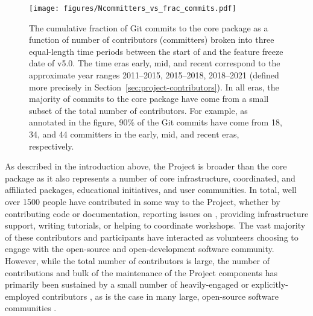 \documentclass[modern]{aastex631}
\begin{document}
\begin{figure}[t!]
    \begin{centering}
      \texttt{[image: figures/Ncommitters\_vs\_frac\_commits.pdf]}
        \caption{
            The cumulative fraction of Git commits to the \astropypkg core
            package as a function of number of contributors (committers) broken
            into three equal-length time periods between the start of \astropypkg
            and the feature freeze date of v5.0.
            The time eras early, mid, and recent correspond to the approximate
            year ranges 2011--2015, 2015--2018, 2018--2021 (defined more
            precisely in Section~\ref{sec:project-contributors}).
            In all eras, the majority of commits to the \astropypkg core package
            have come from a small subset of the total number of contributors.
            For example, as annotated in the figure, 90\% of the Git commits
            have come from 18, 34, and 44 committers in the early, mid, and
            recent eras, respectively.
        }
        \label{fig:contributor-summary:Ncommitters}
    \end{centering}
\end{figure}

As described in the introduction above, the \astropy Project is broader than the
core \astropypkg package as it also represents a number of core infrastructure,
coordinated, and affiliated packages, educational initiatives, and user communities.
In total, well over 1500 people have contributed in some way to the Project,
whether by contributing code or documentation, reporting issues
on \github, providing infrastructure support, writing tutorials, or helping to
coordinate \astropy workshops.
The vast majority of these contributors and participants have interacted as
volunteers choosing to engage with the open-source and open-development software
community.
However, while the total number of contributors is large, the number of
contributions and bulk of the maintenance of the \astropy Project components has
primarily been sustained by a small number of heavily-engaged or
explicitly-employed contributors \citep[e.g.,][]{astropy:2018}, as is the
case in many large, open-source software communities
\citep[e.g.,][]{numpy:nature}.
\end{document}
